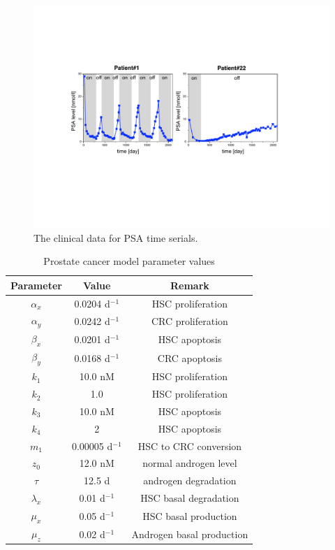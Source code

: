 \begin{figure}[htb]
\centering
\includegraphics[scale=0.45]{fig-data}
\caption{The clinical data for PSA time serials.}
\label{data}
 \vspace{-0.3cm}
\end{figure}




\begin{table}[ht]
\caption{Prostate cancer model parameter values\label{prostate}}
\centering
\small
\begin{tabular}{|c|c|c|}
\hline
Parameter  & Value & Remark  \\\hline
$\alpha_x$ & 0.0204 d$^{-1}$ & HSC proliferation \\
$\alpha_y$ & 0.0242 d$^{-1}$ & CRC proliferation  \\
$\beta_x$  & 0.0201 d$^{-1}$ & HSC apoptosis  \\
$\beta_y$  & 0.0168 d$^{-1}$ & CRC apoptosis \\
$k_1$     & 10.0 nM & HSC proliferation  \\
$k_2$     & 1.0 & HSC proliferation  \\
$k_3$     & 10.0 nM & HSC apoptosis  \\
$k_4$     &  2 & HSC apoptosis   \\
$m_1$     & 0.00005 d$^{-1}$ & HSC to CRC conversion  \\
$z_0$     & 12.0 nM & normal androgen level  \\
$\tau$     & 12.5 d & androgen degradation  \\
$\lambda_x$     & 0.01 d$^{-1}$ & HSC basal degradation \\
$\mu_x$     & 0.05 d$^{-1}$ & HSC basal production\\
$\mu_z$     & 0.02 d$^{-1}$ & Androgen basal production \\
\hline
\end{tabular}
\end{table}

